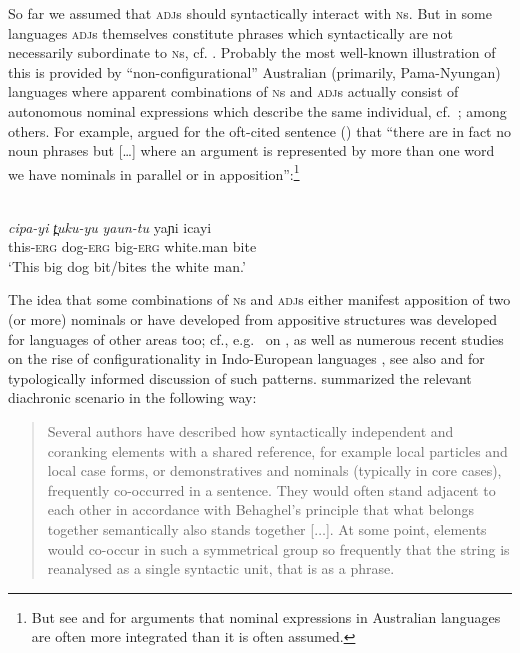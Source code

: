 \documentclass[output=paper
  ,nobabel
  ,draftmode
  ,colorlinks, citecolor=brown
]{langscibook}
\begin{document}
So far we assumed that \textsc{adj}s should syntactically interact with \textsc{n}s. But in some
languages \textsc{adj}s themselves constitute phrases which syntactically are not necessarily
subordinate to \textsc{n}s, cf.  \citet*[13--14]{Riessler2016}. Probably the most well-known
illustration of this is provided by ``non-configurational'' Australian (primarily, Pama-Nyungan)
languages where apparent combinations of \textsc{n}s and \textsc{adj}s actually consist of
autonomous nominal expressions which describe the same individual, cf.\ \citet{Blake1983};
\citet{Heath1984} among others. For example, \citet*[145]{Blake1983} argued for the oft-cited
sentence () that ``there are in fact no noun phrases but [\ldots] where an argument is represented by
more than one word we have nominals in parallel or in apposition'':\footnote{But see \citet{LouagieVerstraete2016} and \citet{Blake2001} for arguments that nominal expressions in Australian languages are often more integrated than it is often assumed.} 


\ea
{}\\
\gll \emph{cipa-yi }      \emph{t̪uku-yu}	\emph{yaun-tu}	yaɲi	       icayi\\ 
     this-\textsc{erg}	dog-\textsc{erg}	big-\textsc{erg}	white.man	bite \\
\glt `This big dog bit/bites the white man.'
\z

\noindent
The idea that some combinations of \textsc{n}s and \textsc{adj}s either manifest apposition of two
(or more) nominals or have developed from appositive structures was developed for languages of other
areas too; cf., e.g.\ \citet*[651-654]{Testelec1998} on , as well as numerous recent studies
on the rise of configurationality in Indo-European languages \parencites{Luraghi2010, Ledgeway2012,
  Spevak2015, Reinoehl2016}, see also \citet*[19--22]{Rijkhoff2002} and
\citet{LouagieReinoehl2022} for typologically informed discussion of such patterns. \citet*[46]{Reinoehl2016} summarized the relevant diachronic scenario in the following way:

\begin{quote}
    Several authors have described how syntactically independent and coranking elements with a shared reference, for example local particles and local case forms, or demonstratives and nominals (typically in core cases), frequently co-occurred in a sentence. They would often stand adjacent to each other in accordance with Behaghel's principle that what belongs together semantically also stands together [$\dots$]. At some point, elements would co-occur in such a symmetrical group so frequently that the string is reanalysed as a single syntactic unit, that is as a phrase. \citep[46]{Reinoehl2016}
\end{quote}
\end{document}
